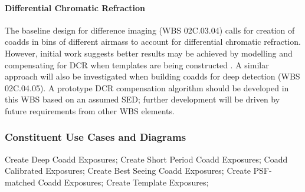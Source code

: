\documentclass[12pt]{article}
\newcommand{\wbsDiffim}{WBS 02C.03.04}
\newcommand{\wbsDetDeblend}{WBS 02C.04.05}
\begin{document}

\paragraph{Differential Chromatic Refraction}

The baseline design for difference imaging (\wbsDiffim) calls for creation of coadds in bins of different airmass to account for differential chromatic refraction. However, initial work suggests better results may be achieved by modelling and compensating for DCR when templates are being constructed \cite{Becker14}. A similar approach will also be investigated when building coadds for deep detection (\wbsDetDeblend). A prototype DCR compensation algorithm should be developed in this WBS based on an assumed SED; further development will be driven by future requirements from other WBS elements.

\subsubsection{Constituent Use Cases and Diagrams}

Create Deep Coadd Exposures; Create Short Period Coadd Exposures; Coadd Calibrated Exposures; Create Best Seeing Coadd Exposures; Create PSF-matched Coadd Exposures;
Create Template Exposures;
\end{document}
